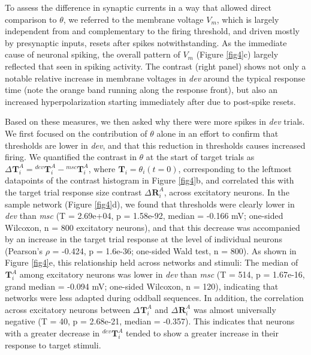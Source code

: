 \documentclass[pdflatex,referee,iicol,sn-basic]{sn-jnl}
\newcommand{\dev}{\textit{dev}}
\newcommand{\msc}{\textit{msc}}
\renewcommand{\R}[3][]{{}^{#1}_{}\!\mathbf{R}^{#2}_{#3}}
\renewcommand{\T}[3][]{{}^{#1}_{}\mathbf{T}^{#2}_{#3}}
\theoremstyle{thmstyleone}%
\theoremstyle{thmstyletwo}%
\theoremstyle{thmstylethree}%
\begin{document}
To assess the difference in synaptic currents in a way that allowed direct comparison to $\theta$, we referred to the membrane voltage $V_m$, which is largely independent from and complementary to the firing threshold, and driven mostly by presynaptic inputs, resets after spikes notwithstanding. As the immediate cause of neuronal spiking, the overall pattern of $V_m$ (Figure \ref{fig4}c) largely reflected that seen in spiking activity. The contrast (right panel) shows not only a notable relative increase in membrane voltages in \dev{} around the typical response time (note the orange band running along the response front), but also an increased hyperpolarization starting immediately after due to post-spike resets.

Based on these measures, we then asked why there were more spikes in \dev{} trials. We first focused on the contribution of $\theta$ alone in an effort to confirm that thresholds are lower in \dev{}, and that this reduction in thresholds causes increased firing. We quantified the contrast in $\theta$ at the start of target trials as $\Delta \T{A}{i} = \T[dev]{A}{i} - \T[msc]{A}{i}$, where $\T{}{i} = \theta_i(t=0)$, corresponding to the leftmost datapoints of the contrast histogram in Figure \ref{fig4}b, and correlated this with the target trial response size contrast $\Delta \R{A}{i}$, across excitatory neurons. In the sample network (Figure \ref{fig4}d), we found that thresholds were clearly lower in \dev{} than \msc{} (T = 2.69e+04, p = 1.58e-92, median = -0.166 mV; one-sided Wilcoxon, n = 800 excitatory neurons), and that this decrease was accompanied by an increase in the target trial response at the level of individual neurons (Pearson's $\rho$ = -0.424, p = 1.6e-36; one-sided Wald test, n = 800). As shown in Figure \ref{fig4}e, this relationship held across networks and stimuli: The median of $\T{A}{i}$ among excitatory neurons was lower in \dev{} than \msc{} (T = 514, p = 1.67e-16, grand median = -0.094 mV; one-sided Wilcoxon, n = 120), indicating that networks were less adapted during oddball sequences. In addition, the correlation across excitatory neurons between $\Delta \T{A}{i}$ and $\Delta \R{A}{i}$ was almost universally negative (T = 40, p = 2.68e-21, median = -0.357). This indicates that neurons with a greater decrease in $\T[dev]{A}{i}$ tended to show a greater increase in their response to target stimuli.
\end{document}
